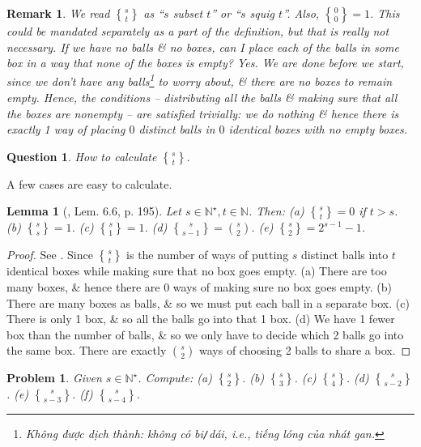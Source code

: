 \documentclass[oneside]{book}
\newtheorem{lemma}{Lemma}
\newtheorem{problem}{Problem}
\newtheorem{question}{Question}
\newtheorem{remark}{Remark}
\newcommand{\genstirlingII}[3]{%
	\genfrac{\{}{\}}{0pt}{#1}{#2}{#3}%
}
\newcommand{\stirlingII}[2]{\genstirlingII{}{#1}{#2}}
\begin{document}
\begin{remark}
	We read $\stirlingII{s}{t}$ as ``$s$ subset $t$'' or ``$s$ squig $t$''. Also, $\stirlingII{0}{0} = 1$. This could be mandated separately as a part of the definition, but that is really not necessary. If we have no balls \& no boxes, can I place each of the balls in some box in a way that none of the boxes is empty? Yes. We are done before we start, since we don't have any balls\footnote{Không được dịch thành: không có bi{\tt/}dái, i.e., tiếng lóng của nhát gan.} to worry about, \& there are no boxes to remain empty. Hence, the conditions -- distributing all the balls \& making sure that all the boxes are nonempty -- are satisfied trivially: we do nothing \& hence there is exactly 1 way of placing $0$ distinct balls in $0$ identical boxes with no empty boxes.
\end{remark}

\begin{question}
	How to calculate $\stirlingII{s}{t}$.
\end{question}
A few cases are easy to calculate.

\begin{lemma}[\cite{Shahriari2022}, Lem. 6.6, p. 195]
	Let $s\in\mathbb{N}^\star,t\in\mathbb{N}$. Then: (a) $\stirlingII{s}{t} = 0$ if $t > s$. (b) $\stirlingII{s}{s} = 1$. (c) $\stirlingII{s}{1} = 1$. (d) $\stirlingII{s}{s - 1} = \binom{s}{2}$. (e) $\stirlingII{s}{2} = 2^{s - 1} - 1$.
\end{lemma}

\begin{proof}
	See \cite[p. 195]{Shahriari2022}. Since $\stirlingII{s}{t}$ is the number of ways of putting $s$ distinct balls into $t$ identical boxes while making sure that no box goes empty. (a) There are too many boxes, \& hence there are 0 ways of making sure no box goes empty. (b) There are many boxes as balls, \& so we must put each ball in a separate box. (c) There is only 1 box, \& so all the balls go into that 1 box. (d) We have 1 fewer box than the number of balls, \& so we only have to decide which 2 balls go into the same box. There are exactly $\binom{s}{2}$ ways of choosing 2 balls to share a box.
\end{proof}

\begin{problem}
	Given $s\in\mathbb{N}^\star$. Compute: (a) $\stirlingII{s}{2}$. (b) $\stirlingII{s}{3}$. (c) $\stirlingII{s}{4}$. (d) $\stirlingII{s}{s - 2}$. (e) $\stirlingII{s}{s - 3}$. (f) $\stirlingII{s}{s - 4}$.
\end{problem}
\end{document}
